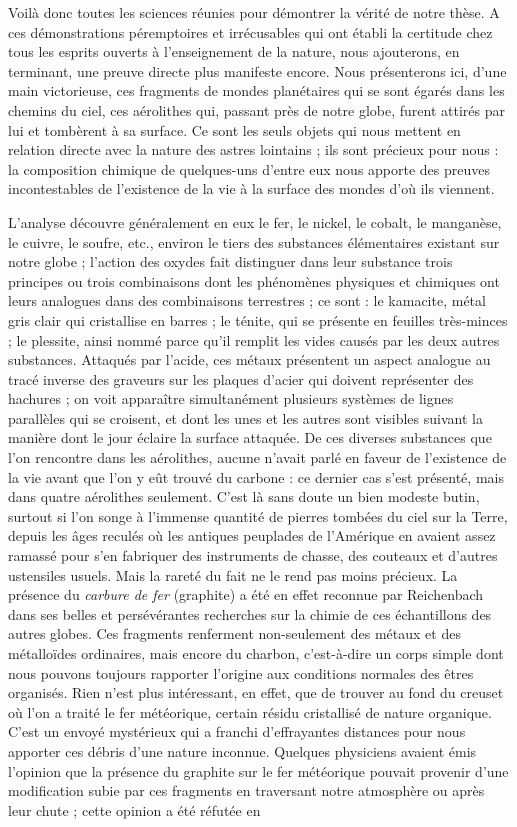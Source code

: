 \documentclass[a4paper, 11pt, oneside, landscape]{article}
\begin{document}
Voilà donc toutes les sciences réunies pour démontrer la vérité de notre thèse. A ces démonstrations péremptoires et irrécusables qui ont établi la certitude chez tous les esprits ouverts à l'enseignement de la nature, nous ajouterons, en terminant, une preuve directe plus manifeste encore. Nous présenterons ici, d'une main victorieuse, ces fragments de mondes planétaires qui se sont égarés dans les chemins du ciel, ces aérolithes qui, passant près de notre globe, furent attirés par lui et tombèrent à sa surface. Ce sont les seuls objets qui nous mettent en relation directe avec la nature des astres lointains ; ils sont précieux pour nous : la composition chimique de quelques-uns d'entre eux nous apporte des preuves incontestables de l'existence de la vie à la surface des mondes d'où ils viennent.

L'analyse découvre généralement en eux le fer, le nickel, le cobalt, le manganèse, le cuivre, le soufre, etc., environ le tiers des substances élémentaires existant sur notre globe ; l'action des oxydes fait distinguer dans leur substance trois principes ou trois combinaisons dont les phénomènes physiques et chimiques ont leurs analogues dans des combinaisons terrestres ; ce sont : le kamacite, métal gris clair qui cristallise en barres ; le ténite, qui se présente en feuilles très-minces ; le plessite, ainsi nommé parce qu'il remplit les vides causés par les deux autres substances. Attaqués par l'acide, ces métaux présentent un aspect analogue au tracé inverse des graveurs sur les plaques d'acier qui doivent représenter des hachures ; on voit apparaître simultanément plusieurs systèmes de lignes parallèles qui se croisent, et dont les unes et les autres sont visibles suivant la manière dont le jour éclaire la surface attaquée. De ces diverses substances que l'on rencontre dans les aérolithes, aucune n'avait parlé en faveur de l'existence de la vie avant que l'on y eût trouvé du carbone : ce dernier cas s'est présenté, mais dans quatre aérolithes seulement. C'est là sans doute un bien modeste butin, surtout si l'on songe à l'immense quantité de pierres tombées du ciel sur la Terre, depuis les âges reculés où les antiques peuplades de l'Amérique en avaient assez ramassé pour s'en fabriquer des instruments de chasse, des couteaux et d'autres ustensiles usuels. Mais la rareté du fait ne le rend pas moins précieux. La présence du \emph{carbure de fer} (graphite) a été en effet reconnue par Reichenbach dans ses belles et persévérantes recherches sur la chimie de ces échantillons des autres globes. Ces fragments renferment non-seulement des métaux et des métalloïdes ordinaires, mais encore du charbon, c'est-à-dire un corps simple dont nous pouvons toujours rapporter l'origine aux conditions normales des êtres organisés. Rien n'est plus intéressant, en effet, que de trouver au fond du creuset où l'on a traité le fer météorique, certain résidu cristallisé de nature organique. C'est un envoyé mystérieux qui a franchi d'effrayantes distances pour nous apporter ces débris d'une nature inconnue. Quelques physiciens avaient émis l'opinion que la présence du graphite sur le fer météorique pouvait provenir d'une modification subie par ces fragments en traversant notre atmosphère ou après leur chute ; cette opinion a été réfutée en 
\end{document}
